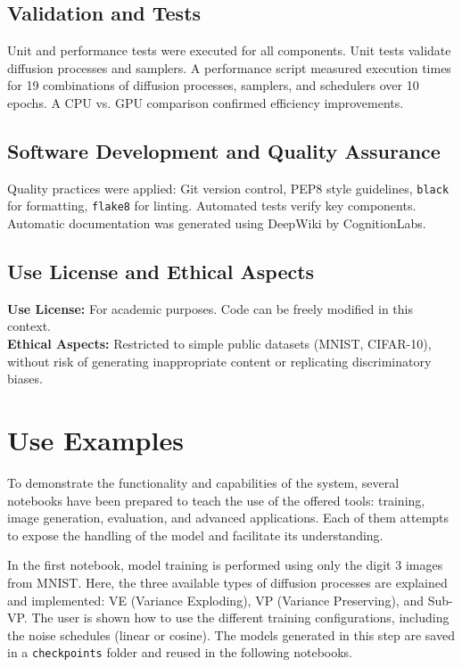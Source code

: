 \documentclass[11pt,a4paper]{article}
\begin{document}
\subsection{Validation and Tests}
Unit and performance tests were executed for all components. Unit tests validate diffusion processes and samplers. A performance script measured execution times for 19 combinations of diffusion processes, samplers, and schedulers over 10 epochs. A CPU vs. GPU comparison confirmed efficiency improvements.

\subsection{Software Development and Quality Assurance}
Quality practices were applied: Git version control, PEP8 style guidelines, \texttt{black} for formatting, \texttt{flake8} for linting. Automated tests verify key components. Automatic documentation was generated using DeepWiki by CognitionLabs.

\subsection{Use License and Ethical Aspects}
\textbf{Use License:} For academic purposes. Code can be freely modified in this context.\\
\textbf{Ethical Aspects:} Restricted to simple public datasets (MNIST, CIFAR-10), without risk of generating inappropriate content or replicating discriminatory biases.

\section{Use Examples}
To demonstrate the functionality and capabilities of the system, several notebooks have been prepared to teach the use of the offered tools: training, image generation, evaluation, and advanced applications. Each of them attempts to expose the handling of the model and facilitate its understanding.

In the first notebook, model training is performed using only the digit 3 images from MNIST. Here, the three available types of diffusion processes are explained and implemented: VE (Variance Exploding), VP (Variance Preserving), and Sub-VP. The user is shown how to use the different training configurations, including the noise schedules (linear or cosine). The models generated in this step are saved in a \texttt{checkpoints} folder and reused in the following notebooks.
\end{document}
